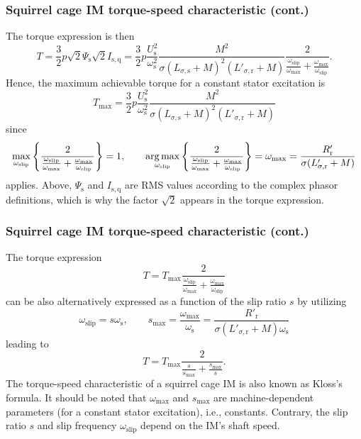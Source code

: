 \begin{frame}
	\frametitle{Squirrel cage IM torque-speed characteristic (cont.)} 
    The torque expression is then
    \begin{equation}
            T = \frac{3}{2} p \sqrt{2}\Psi_\mathrm{s} \sqrt{2}I_\mathrm{s,q} = \frac{3}{2} p \frac{U_\mathrm{s}^2}{\omega_\mathrm{s}^2}\frac{M^2}{\sigma (L_{\sigma,\mathrm{s}} +M)^2(L'_{\sigma,\mathrm{r}} +M)}\frac{2}{\frac{\omega_\mathrm{slip}}{\omega_\mathrm{max}} + \frac{\omega_\mathrm{max}}{\omega_\mathrm{slip}}}.
    \end{equation}
    Hence, the maximum achievable torque for a constant stator excitation is
    \begin{equation}
        T_\mathrm{max} = \frac{3}{2} p \frac{U_\mathrm{s}^2}{\omega_\mathrm{s}^2}\frac{M^2}{\sigma (L_{\sigma,\mathrm{s}} +M)^2(L'_{\sigma,\mathrm{r}} +M)}
    \end{equation}
    since 
    $$ \max_{\omega_{\mathrm{slip}}} \left\{\frac{2}{\frac{\omega_\mathrm{slip}}{\omega_\mathrm{max}} + \frac{\omega_\mathrm{max}}{\omega_\mathrm{slip}}}\right\} = 1, \qquad \operatorname*{arg\,max}_{\omega_{\mathrm{slip}}} \left\{\frac{2}{\frac{\omega_\mathrm{slip}}{\omega_\mathrm{max}} + \frac{\omega_\mathrm{max}}{\omega_\mathrm{slip}}}\right\} = \omega_\mathrm{max}=\frac{R'_\mathrm{r}}{\sigma (L'_{\sigma,\mathrm{r}} +M)}$$ 
    applies. Above, $\Psi_\mathrm{s}$ and $I_\mathrm{s,q}$ are RMS values according to the complex phasor definitions, which is why the factor $\sqrt{2}$ appears in the torque expression.
\end{frame}

\begin{frame}
	\frametitle{Squirrel cage IM torque-speed characteristic (cont.)} 
    The torque expression
    \begin{equation}
        T = T_\mathrm{max} \frac{2}{\frac{\omega_\mathrm{slip}}{\omega_\mathrm{max}} + \frac{\omega_\mathrm{max}}{\omega_\mathrm{slip}}}
    \end{equation}
    can be also alternatively expressed as a function of the slip ratio $s$ by utilizing
    $$
        \omega_\mathrm{slip} = s \omega_\mathrm{s}, \qquad s_\mathrm{max} = \frac{\omega_\mathrm{max}}{\omega_\mathrm{s}} = \frac{R'_\mathrm{r}}{\sigma (L'_{\sigma,\mathrm{r}} +M)\omega_\mathrm{s}}
    $$
    leading to
    \begin{equation}
        T = T_\mathrm{max} \frac{2}{\frac{s}{s_\mathrm{max}} + \frac{s_\mathrm{max}}{s}}.
    \end{equation}
    The torque-speed characteristic of a squirrel cage IM is also known as Kloss's formula. It should be noted that $\omega_\mathrm{max}$ and $s_\mathrm{max}$ are machine-dependent parameters (for a constant stator excitation), i.e., constants. Contrary, the slip ratio $s$ and slip frequency $\omega_\mathrm{slip}$ depend on the IM's shaft speed.
\end{frame}

